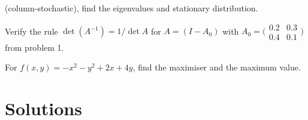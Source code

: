 \begin{problems}
        (column-stochastic), find the eigenvalues and stationary
        distribution.
  \item Verify the rule $\det(A^{-1}) = 1/\det A$ for $A = (I - A_{0})$ with
        $A_{0} = \bigl(\begin{smallmatrix} 0.2 & 0.3 \\ 0.4 & 0.1 \end{smallmatrix}\bigr)$
        from problem 1.
  \item For $f(x, y) = -x^{2} - y^{2} + 2 x + 4 y$, find the maximiser and
        the maximum value.
\end{problems}

\section{Solutions}

